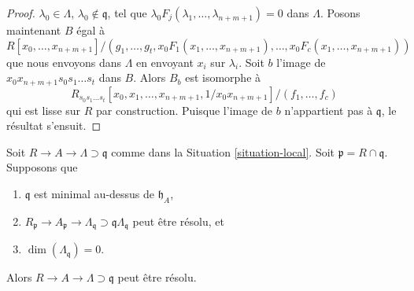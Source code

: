 \begin{proof}
$\lambda_0 \in \Lambda$, $\lambda_0 \not \in \mathfrak q$, tel que
$\lambda_0 F_j(\lambda_1, \ldots, \lambda_{n + m + 1}) = 0$
dans $\Lambda$. Posons maintenant $B$ égal à
$$
R[x_0, \ldots, x_{n + m + 1}]/
(g_1, \ldots, g_t, x_0F_1(x_1, \ldots, x_{n + m + 1}), \ldots,
x_0F_c(x_1, \ldots, x_{n + m + 1}))
$$
que nous envoyons dans $\Lambda$ en envoyant $x_i$ sur $\lambda_i$.
Soit $b$ l'image de $x_0 x_{n + m + 1} s_0 s_1 \ldots s_t$ dans $B$.
Alors $B_b$ est isomorphe à
$$
R_{s_0s_1 \ldots s_t}[x_0, x_1, \ldots, x_{n + m + 1}, 1/x_0x_{n + m + 1}]/
(f_1, \ldots, f_c)
$$
qui est lisse sur $R$ par construction.
Puisque l'image de $b$ n'appartient pas à $\mathfrak q$, le résultat s'ensuit.
\end{proof}

\begin{lemma}
\label{lemma-delocalize-height-zero}
Soit $R \to A \to \Lambda \supset \mathfrak q$ comme dans la
Situation \ref{situation-local}. Soit $\mathfrak p = R \cap \mathfrak q$.
Supposons que
\begin{enumerate}
\item $\mathfrak q$ est minimal au-dessus de $\mathfrak h_A$,
\item $R_\mathfrak p \to A_\mathfrak p \to \Lambda_\mathfrak q
\supset \mathfrak q\Lambda_\mathfrak q$ peut être résolu, et
\item $\dim(\Lambda_\mathfrak q) = 0$.
\end{enumerate}
Alors $R \to A \to \Lambda \supset \mathfrak q$ peut être résolu.
\end{lemma}


